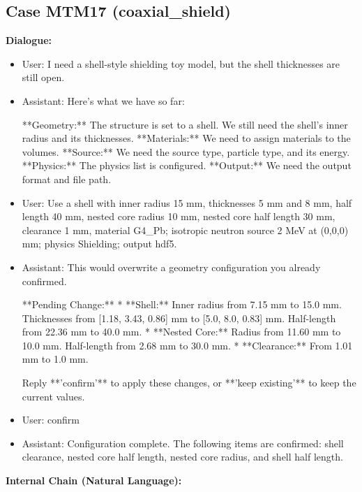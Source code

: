 \documentclass[11pt]{ctexart}
\begin{document}
\subsection{Case MTM17 (coaxial\_shield)}
\textbf{Dialogue:}
\begin{itemize}
\item User: I need a shell-style shielding toy model, but the shell thicknesses are still open.
\item Assistant: Here's what we have so far:

**Geometry:** The structure is set to a shell. We still need the shell's inner radius and its thicknesses.
**Materials:** We need to assign materials to the volumes.
**Source:** We need the source type, particle type, and its energy.
**Physics:** The physics list is configured.
**Output:** We need the output format and file path.
\item User: Use a shell with inner radius 15 mm, thicknesses 5 mm and 8 mm, half length 40 mm, nested core radius 10 mm, nested core half length 30 mm, clearance 1 mm, material G4\_Pb; isotropic neutron source 2 MeV at (0,0,0) mm; physics Shielding; output hdf5.
\item Assistant: This would overwrite a geometry configuration you already confirmed.

**Pending Change:**
*   **Shell:** Inner radius from 7.15 mm to 15.0 mm. Thicknesses from [1.18, 3.43, 0.86] mm to [5.0, 8.0, 0.83] mm. Half-length from 22.36 mm to 40.0 mm.
*   **Nested Core:** Radius from 11.60 mm to 10.0 mm. Half-length from 2.68 mm to 30.0 mm.
*   **Clearance:** From 1.01 mm to 1.0 mm.

Reply **'confirm'** to apply these changes, or **'keep existing'** to keep the current values.
\item User: confirm
\item Assistant: Configuration complete. The following items are confirmed: shell clearance, nested core half length, nested core radius, and shell half length.
\end{itemize}
\textbf{Internal Chain (Natural Language):}
\end{document}
